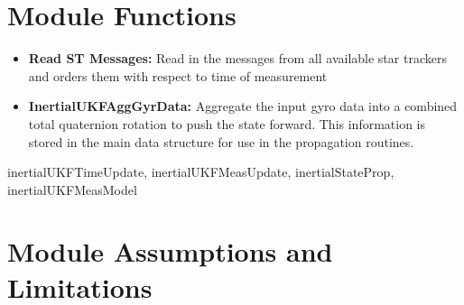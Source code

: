 

\section{Module Functions}

\begin{itemize}
    \item \textbf{Read ST Messages: } Read in the messages from all available star trackers and orders them with respect to time of measurement
    \item \textbf{InertialUKFAggGyrData: } Aggregate the input gyro data into a combined total quaternion 
    rotation to push the state forward.  This information is stored in the 
    main data structure for use in the propagation routines.
\end{itemize}


inertialUKFTimeUpdate, inertialUKFMeasUpdate, inertialStateProp, inertialUKFMeasModel
\section{Module Assumptions and Limitations}



